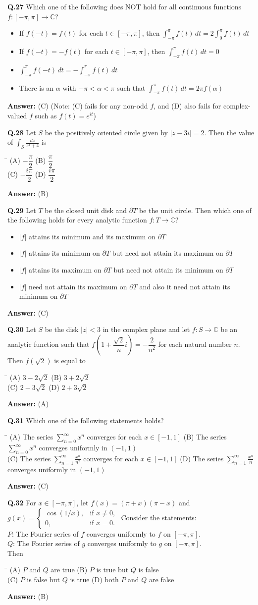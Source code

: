\documentclass[11pt,a4paper]{article}
\newcommand{\optsfourA}[4]{%
  \begin{tabbing}
    \hspace{0.48\linewidth}\=\kill
    (A) #1 \> (B) #2 \\[2pt]
    (C) #3 \> (D) #4
  \end{tabbing}%
}
\newcommand{\optslistA}[4]{%
  \begin{itemize}
    \setlength{\itemsep}{2pt}\setlength{\parskip}{0pt}
    \item[(A)] #1
    \item[(B)] #2
    \item[(C)] #3
    \item[(D)] #4
  \end{itemize}%
}
\newcommand{\ans}[1]{\textbf{Answer:} #1\par\medskip}
\begin{document}
\textbf{Q.27} Which one of the following does NOT hold for all continuous functions $f : [-\pi, \pi] \to \mathbb{C}$?
\optslistA{If $f(-t) = f(t)$ for each $t \in [-\pi, \pi]$, then $\displaystyle\int_{-\pi}^{\pi} f(t)\,dt = 2\int_0^\pi f(t)\,dt$}{If $f(-t) = -f(t)$ for each $t \in [-\pi, \pi]$, then $\displaystyle\int_{-\pi}^{\pi} f(t)\,dt = 0$}{$\displaystyle\int_{-\pi}^{\pi} f(-t)\,dt = -\int_{-\pi}^{\pi} f(t)\,dt$}{There is an $\alpha$ with $-\pi < \alpha < \pi$ such that $\displaystyle\int_{-\pi}^{\pi} f(t)\,dt = 2\pi f(\alpha)$}
\ans{(C) (Note: (C) fails for any non-odd $f$, and (D) also fails for complex-valued $f$ such as $f(t)=e^{it}$)}

\textbf{Q.28} Let $S$ be the positively oriented circle given by $|z - 3i| = 2$. Then the value of $\displaystyle\int_S \frac{dz}{z^2 + 4}$ is
\optsfourA{$-\dfrac{\pi}{2}$}{$\dfrac{\pi}{2}$}{$-\dfrac{i\pi}{2}$}{$\dfrac{i\pi}{2}$}
\ans{(B)}

\textbf{Q.29} Let $T$ be the closed unit disk and $\partial T$ be the unit circle. Then which one of the following holds for every analytic function $f : T \to \mathbb{C}$?
\optslistA{$|f|$ attains its minimum and its maximum on $\partial T$}{$|f|$ attains its minimum on $\partial T$ but need not attain its maximum on $\partial T$}{$|f|$ attains its maximum on $\partial T$ but need not attain its minimum on $\partial T$}{$|f|$ need not attain its maximum on $\partial T$ and also it need not attain its minimum on $\partial T$}
\ans{(C)}

\textbf{Q.30} Let $S$ be the disk $|z| < 3$ in the complex plane and let $f : S \to \mathbb{C}$ be an analytic function such that $f\!\left(1 + \dfrac{\sqrt{2}}{n}i\right) = -\dfrac{2}{n^2}$ for each natural number $n$. Then $f(\sqrt{2})$ is equal to
\optsfourA{$3 - 2\sqrt{2}$}{$3 + 2\sqrt{2}$}{$2 - 3\sqrt{2}$}{$2 + 3\sqrt{2}$}
\ans{(A)}

\textbf{Q.31} Which one of the following statements holds?
\optsfourA{The series $\displaystyle\sum_{n=0}^{\infty} x^n$ converges for each $x \in [-1, 1]$}{The series $\displaystyle\sum_{n=0}^{\infty} x^n$ converges uniformly in $(-1, 1)$}{The series $\displaystyle\sum_{n=1}^{\infty} \frac{x^n}{n^2}$ converges for each $x \in [-1, 1]$}{The series $\displaystyle\sum_{n=1}^{\infty} \frac{x^n}{n}$ converges uniformly in $(-1, 1)$}
\ans{(C)}

\textbf{Q.32} For $x \in [-\pi, \pi]$, let $f(x) = (\pi + x)(\pi - x)$ and $g(x) = \begin{cases} \cos(1/x), & \text{if } x \ne 0, \\ 0, & \text{if } x = 0. \end{cases}$ Consider the statements:\\
$P$: The Fourier series of $f$ converges uniformly to $f$ on $[-\pi, \pi]$.\\
$Q$: The Fourier series of $g$ converges uniformly to $g$ on $[-\pi, \pi]$.\\
Then
\optsfourA{$P$ and $Q$ are true}{$P$ is true but $Q$ is false}{$P$ is false but $Q$ is true}{both $P$ and $Q$ are false}
\ans{(B)}
\end{document}
